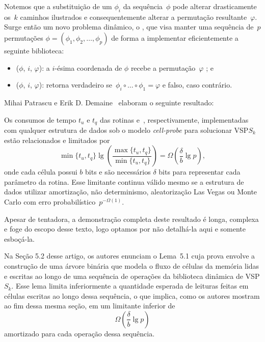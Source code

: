 Notemos que a substituição de um $\phi_i$ da sequência~$\phi$ pode alterar drasticamente os~$k$ caminhos ilustrados e consequentemente alterar a permutação resultante~$\varphi$. Surge então um novo problema dinâmico, o , que visa manter uma sequência de~$p$ permutações ${\phi=(\phi_1, \phi_2, \ldots, \phi_p)}$ de forma a implementar eficientemente a seguinte biblioteca:
\begin{itemize}
\item \VPSPupdate($\phi$, $i$, $\varphi$): a $i$-ésima coordenada de $\phi$ recebe a permutação~$\varphi$ ; e
\item \VPSPverify($\phi$, $i$, $\varphi$): retorna verdadeiro se~$\phi_i\circ \ldots\circ \phi_1 = \varphi$ e falso, caso contrário.
\end{itemize}

Mihai Patrascu e Erik D. Demaine~\cite{lowerBoundPatrascu} elaboram o seguinte resultado:

\begin{theorem}
\label{theo:lim}
Os consumos de tempo $t_u$ e $t_q$ das rotinas \VPSPupdate{} e~\VPSPverify, respectivamente, implementadas com qualquer estrutura de dados sob o modelo \textit{cell-probe} para solucionar VSP$S_k$ estão relacionados e limitados por
$$
\min\{t_u,t_q\}\lg \left( \frac{\max\{t_u,t_q\}}{\min\{t_u,t_q\}}\right) = \Omega\left(\frac{\delta}{b}\lg p\right),
$$
onde cada célula possui $b$ bits e são necessários $\delta$ bits para representar cada parâmetro da rotina.  Esse limitante continua válido mesmo se a estrutura de dados utilizar amortização, não determinismo, aleatorização Las Vegas ou Monte Carlo com erro probabilístico~$p^{-\Omega(1)}$.
\end{theorem}

Apesar de tentadora, a demonstração completa deste resultado é longa, complexa e foge do escopo desse texto, logo optamos por não detalhá-la aqui e somente esboçá-la.

Na Seção 5.2 desse artigo, os autores enunciam o Lema~5.1 cuja prova envolve a construção de uma árvore binária que modela o fluxo de células da memória lidas e escritas ao longo de uma sequência de operações da biblioteca dinâmica de VSP$S_k$. Esse lema limita inferiormente a quantidade esperada de leituras feitas em células escritas ao longo dessa sequência, o que implica, como os autores mostram ao fim dessa mesma seção, em um limitante inferior de
\begin{equation}
    \Omega\left(\frac{\delta}{b}\lg p\right) \label{eq:lim}
\end{equation}
amortizado para cada operação dessa sequência.

